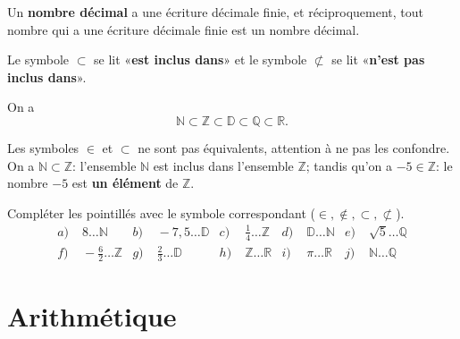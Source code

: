 \documentclass[11pt]{article}
\begin{document}
\begin{rmq}
  Un \textbf{nombre décimal} a une écriture décimale finie, et réciproquement,
  tout nombre qui a une écriture décimale finie est un nombre décimal.
\end{rmq}
\begin{notation}
  Le symbole $\subset$ se lit «\textbf{est inclus dans}» et le symbole
  $\not\subset$ se lit «\textbf{n'est pas inclus dans}».
\end{notation}
\begin{propadm}
  On a 
  \[
    \mathbb{N}\subset\mathbb{Z}\subset\mathbb{D}\subset\mathbb{Q}\subset\mathbb{R}.
  \]
\end{propadm}
\begin{rmq}
  Les symboles $\in$ et $\subset$ ne sont pas équivalents, attention à ne pas
  les confondre. On a $\mathbb{N}\subset \mathbb{Z}$: l'ensemble $\mathbb{N}$
  est inclus dans l'ensemble $\mathbb{Z}$; tandis qu'on a $-5\in\mathbb{Z}$: le
  nombre $-5$ est \textbf{un élément} de $\mathbb{Z}$.
\end{rmq}

\begin{app}
  Compléter les pointillés avec le symbole correspondant ($\in, \notin,
  \subset, \not\subset$).
\begin{align*}
  a)&\; 8 \ldots \mathbb{N} &
  b)&\; -7,5 \ldots \mathbb{D} &
  c)&\; \frac{1}{4} \ldots \mathbb{Z} &
  d)&\; \mathbb{D} \ldots \mathbb{N} &
  e)&\; \sqrt 5 \ldots \mathbb{Q} \\
  f)&\; -\frac{6}{2} \ldots \mathbb{Z} &
  g)&\; \frac{2}{3} \ldots \mathbb{D} &
  h)&\; \mathbb{Z} \ldots \mathbb{R} &
  i)&\; \pi \ldots \mathbb{R} &
  j)&\; \mathbb{N} \ldots \mathbb{Q}
\end{align*}
\end{app}

\section{Arithmétique}
\end{document}
